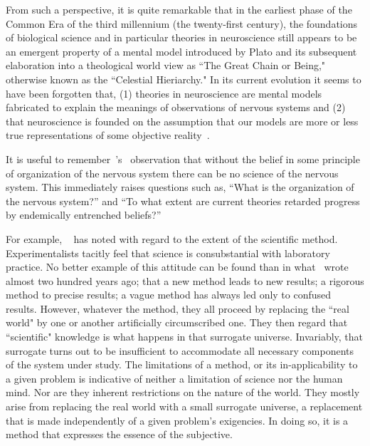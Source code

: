 \documentclass[11pt,3p,twocolumn]{JMN}
\begin{document}
From such a perspective, it is quite remarkable that in the earliest phase of the Common Era of the third millennium (the twenty-first century), the foundations of biological science and in particular theories in neuroscience still appears to be an emergent property of a mental model introduced by Plato and its subsequent elaboration into a theological world view as ``The Great Chain or Being," otherwise known as the ``Celestial Hieriarchy." In its current evolution it seems to have been forgotten that, (1) theories in neuroscience are mental models fabricated to explain the meanings of observations of nervous systems and (2) that neuroscience is founded on the assumption that our models are more or less true representations of some objective reality~\citep{jacobson93}.

It is useful to remember~\citeauthor{jacobson93}'s~\citeyear{jacobson93} observation that without the belief in some principle of organization of the nervous system there can
be no science of the nervous system. This immediately raises questions such as, ``What is the organization of the nervous system?'' and ``To what extent are current theories retarded progress by endemically entrenched beliefs?''

For example, ~\citet{rosen96} has noted with regard to the extent of the scientific method. Experimentalists tacitly feel that science is consubstantial with laboratory practice. No better example of this attitude can be found than in what~\citet{flourens24} wrote almost two hundred years ago; that a new method leads to new results; a rigorous method to precise results; a vague method has always led only to confused results. However, whatever the method, they all proceed by replacing the ``real world" by one or another artificially circumscribed one. They then regard that ``scientific" knowledge is what happens in that surrogate universe. Invariably, that surrogate turns out to be insufficient to accommodate all necessary components of the system under study. The limitations of a method, or its in-applicability to a given problem is indicative of neither a limitation of science nor the human mind. Nor are they inherent restrictions on the nature of the world.  They mostly arise from replacing the real world with a small surrogate universe, a replacement that is made independently of a given problem's exigencies. In doing so, it is a method that expresses the essence of the subjective.
\end{document}
